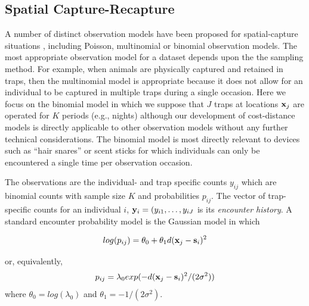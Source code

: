 \documentclass[12pt]{article}
\begin{document}
\begin{spacing}{1.8}
\section{Spatial Capture-Recapture}

A number of distinct observation models have been proposed for
spatial-capture situations \citep{borchers_efford:2008,
  royle_etal:2009ecol, efford_etal:2009ecol}, including Poisson,
multinomial or binomial observation models. The most appropriate
observation model for a dataset depends upon the the sampling method.
For example, when animals are physically captured and retained in
traps, then the multinomial model is appropriate because it does not
allow for an individual to be captured in multiple traps during a
single occasion. Here we focus on the binomial model in which we
suppose that $J$ traps at locations ${\bf x}_{j}$ are operated for $K$
periods (e.g., nights) although our development of cost-distance
models is directly applicable to other observation models without any
further technical considerations. The binomial model is most directly
relevant to devices such as ``hair snares''
\citep{woods_etal:1999,gardner_etal:2010} or scent sticks
\citep{kery_etal:2010} for which individuals can only be encountered a
single time per observation occasion.

The observations are the individual- and trap specific counts $y_{ij}$
which are binomial counts with sample size $K$ and probabilities
$p_{ij}$. The vector of trap-specific counts for an individual $i$,
 ${\bf y}_{i} = (y_{i1},\ldots,y_{iJ}$ is its {\it encounter history}.
A standard encounter probability model
\citep{borchers_efford:2008} is the Gaussian model in which

\begin{equation}
log(p_{ij})= \theta_{0} + \theta_{1} d({\bf x}_{j} - {\bf s}_{i})^{2}
\label{eq.encounter}
\end{equation}

{\flushleft or, equivalently, }
\[
p_{ij} = \lambda_{0} exp(-  d({\bf x}_{j} - {\bf s}_{i})^{2}
/(2\sigma^{2}) )
\]
where $\theta_{0} = log(\lambda_{0})$ and $\theta_{1} =
-1/(2\sigma^2)$.



\end{spacing}
\end{document}
